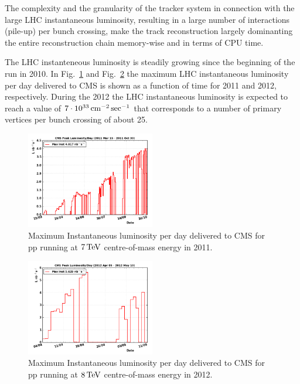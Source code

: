The complexity and the granularity of the tracker system in
connection with the large LHC instantaneous luminosity, resulting in a
large number of interactions (pile-up) per bunch crossing, make the
track reconstruction largely dominanting the entire reconstruction
chain memory-wise and in terms of CPU time.


The LHC instanteneous luminosity is steadily growing since the
beginning of the run in 2010. In Fig.~\ref{fig:LHCinstLumi2011} and
Fig.~\ref{fig:LHCinstLumi2012} the maximum LHC instantaneous
luminosity per day delivered to CMS is shown as a function of time for 2011 and 
2012, respectively. During the 2012 the LHC instantaneous luminosity is expected to
reach a value of $7\cdot10^{33}\rm \, cm^{-2}\sec^{-1}$ that corresponds to a number
of primary vertices per bunch crossing of about 25.
\begin{figure}[t]
\begin{center}
\includegraphics*[width=0.5\textwidth]{figs/lumipeak-2011.png}
\caption{Maximum Instantaneous luminosity per day delivered to CMS for
  pp running at $7{\rm \, TeV}$ centre-of-mass energy in 2011.} 
\label{fig:LHCinstLumi2011}
\end{center}
\end{figure}
\begin{figure}[b]
\begin{center}
\includegraphics*[width=0.5\textwidth]{figs/lumipeak-pp-2012.png}
\caption{Maximum Instantaneous luminosity per day delivered to CMS for
  pp running at $8{\rm \, TeV}$ centre-of-mass energy in 2012.} 
\label{fig:LHCinstLumi2012}
\end{center}
\end{figure}

